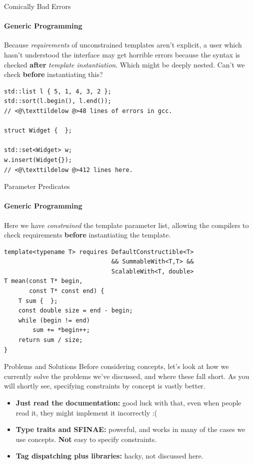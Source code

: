 \documentclass{beamer}
\begin{document}
    \begin{frame}[fragile]{Comically Bad Errors}
        \framesubtitle{Generic Programming}
        Because \emph{requirements} of unconstrained templates aren't explicit, a user which hasn't understood the interface may get horrible errors because the syntax is checked \textbf{after} \emph{template instantiation}. Which might be deeply nested. Can't we check \textbf{before} instantiating this?
        \begin{center}
            \begin{lstlisting}[caption={classic code examples that give ``bad'' template error messages.}]
std::list l { 5, 1, 4, 3, 2 };
std::sort(l.begin(), l.end());
// <@\texttildelow @>48 lines of errors in gcc.

struct Widget {  };

std::set<Widget> w;
w.insert(Widget{});
// <@\texttildelow @>412 lines here.\end{lstlisting}
        \end{center}
    \end{frame}

    \begin{frame}[fragile]{Parameter Predicates}
        \framesubtitle{Generic Programming}
        Here we have \emph{constrained} the template parameter list, allowing the compilers to check requirements \textbf{before} instantiating the template.
        \begin{center}
        \begin{lstlisting}[caption={constraining the function template using a \texttt{requires} clause.}]
template<typename T> requires DefaultConstructible<T>
                              && SummableWith<T,T> &&
                              ScalableWith<T, double>
T mean(const T* begin,
       const T* const end) {
    T sum {  };
    const double size = end - begin;
    while (begin != end)
        sum += *begin++;
    return sum / size;
} \end{lstlisting}
        \end{center}
    \end{frame}

    \begin{frame}[fragile]{Problems and Solutions}
        Before considering concepts, let's look at how we currently solve the problems we've discussed, and where these fall short. As you will shortly see, specifying constraints by concept is vastly better.
        \vspace{1em}
        \begin{itemize}
            \item{\textbf{Just read the documentation:} good luck with that, even when people read it, they might implement it incorrectly :(}
            \item{\textbf{Type traits and SFINAE:} powerful, and works in many of the cases we use concepts. \textbf{Not} easy to specify constraints.}
            \item{\textbf{Tag dispatching plus libraries:} hacky, not discussed here.}
        \end{itemize}
    \end{frame}
\end{document}
